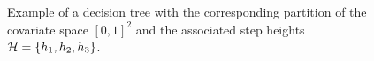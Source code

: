 \begin{figure}[tb]
\begin{minipage}{.5\linewidth}
    \end{minipage}
    \caption{Example of a decision tree with the corresponding partition of the covariate space $[0,1]^2$ and the associated step heights $\mathcal{H} = \{h_1, h_2, h_3\}$.}
    \label{ExampleTree}
\end{figure}

